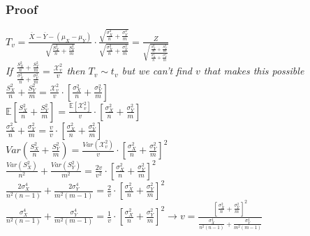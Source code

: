 \documentclass{article}
\begin{document}
\subsubsection{Proof}
$T_v=\frac{\overline{X}-\overline{Y}-(\mu_X-\mu_Y)}{\sqrt{\frac{S_X^2}{n}+\frac{S_Y^2}{m}}}\cdot\frac{\sqrt{\frac{\sigma_X^2}{n}+\frac{\sigma_Y^2}{m}}}{\sqrt{\frac{\sigma_X^2}{n}+\frac{\sigma_Y^2}{m}}}=\frac{Z}{\sqrt{\frac{\frac{S_X^2}{n}+\frac{S_Y^2}{m}}{\frac{\sigma_X^2}{n}+\frac{\sigma_Y^2}{m}}}}$\\
\textit{If $\frac{\frac{S_X^2}{n}+\frac{S_Y^2}{m}}{\frac{\sigma_X^2}{n}+\frac{\sigma_Y^2}{m}}=\frac{\mathcal{X}^2_v}{v}$ then $T_v\sim t_v$ but we can't find $v$ that makes this possible}\\
$\frac{S_X^2}{n}+\frac{S_Y^2}{m}=\frac{\mathcal{X}^2_v}{v}\cdot[\frac{\sigma_X^2}{n}+\frac{\sigma_Y^2}{m}]$\\
$\mathbb{E}[\frac{S_X^2}{n}+\frac{S_Y^2}{m}]=\frac{\mathbb{E}[\mathcal{X}^2_v]}{v}\cdot[\frac{\sigma_X^2}{n}+\frac{\sigma_Y^2}{m}]$\\
$\frac{\sigma_X^2}{n}+\frac{\sigma_Y^2}{m}=\frac{v}{v}\cdot[\frac{\sigma_X^2}{n}+\frac{\sigma_Y^2}{m}]$\\
\newline
$Var(\frac{S_X^2}{n}+\frac{S_Y^2}{m})=\frac{Var(\mathcal{X}^2_v)}{v}\cdot[\frac{\sigma_X^2}{n}+\frac{\sigma_Y^2}{m}]^2$\\
$\frac{Var(S_X^2)}{n^2}+\frac{Var(S_Y^2)}{m^2}=\frac{2v}{v^2}\cdot[\frac{\sigma_X^2}{n}+\frac{\sigma_Y^2}{m}]^2$\\
$\frac{2\sigma_X^4}{n^2(n-1)}+\frac{2\sigma_Y^4}{m^2(m-1)}=\frac{2}{v}\cdot[\frac{\sigma_X^2}{n}+\frac{\sigma_Y^2}{m}]^2$\\
$\frac{\sigma_X^4}{n^2(n-1)}+\frac{\sigma_Y^4}{m^2(m-1)}=\frac{1}{v}\cdot[\frac{\sigma_X^2}{n}+\frac{\sigma_Y^2}{m}]^2\rightarrow v=\frac{[\frac{\sigma_X^2}{n}+\frac{\sigma_Y^2}{m}]^2}{\frac{\sigma_X^4}{n^2(n-1)}+\frac{\sigma_Y^4}{m^2(m-1)}}$
\end{document}
